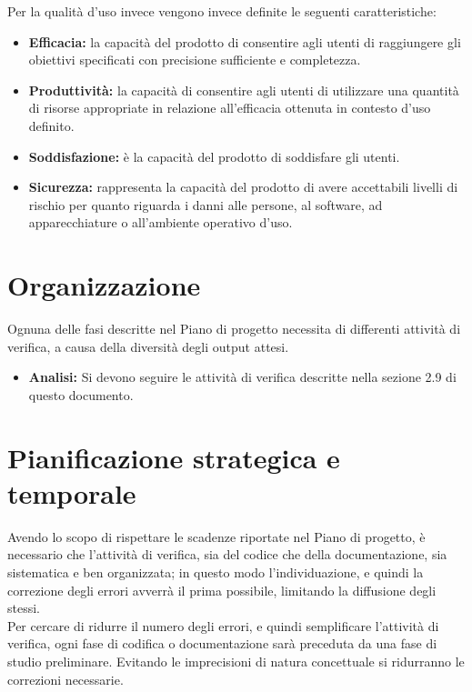 \documentclass[a4paper]{report}
\begin{document}
				Per la qualità d'uso invece vengono invece definite le seguenti caratteristiche:
				\begin{itemize}
					\item \textbf{Efficacia:} la capacità del prodotto di consentire agli utenti di raggiungere gli obiettivi
					specificati con precisione sufficiente e completezza. 
					\item \textbf{Produttività:} la capacità di consentire agli utenti di utilizzare una quantità di risorse
					appropriate in relazione all'efficacia ottenuta in contesto d'uso definito. 
					\item \textbf{Soddisfazione:} è la capacità del prodotto di soddisfare gli utenti. 
					\item \textbf{Sicurezza:} rappresenta la capacità del prodotto di avere accettabili livelli di rischio per
					quanto riguarda i danni alle persone, al software, ad apparecchiature o all'ambiente operativo d'uso. 
				\end{itemize}
			
			
		\section{Organizzazione}
			Ognuna delle fasi descritte nel Piano di progetto necessita di differenti attività di verifica, a causa della
			diversità degli output attesi.
			\begin{itemize}
				\item \textbf{Analisi:} Si devono seguire le attività di verifica descritte nella sezione 2.9 di questo documento.
			\end{itemize}
		
		
		\section{Pianificazione strategica e temporale}
			Avendo lo scopo di rispettare le scadenze riportate nel Piano di progetto, è necessario che l'attività 
			di verifica, sia del codice che della documentazione, sia sistematica e ben organizzata; in questo modo 
			l'individuazione, e quindi la correzione degli errori avverrà il prima possibile, limitando la diffusione 
			degli stessi.\\
			Per cercare di ridurre il numero degli errori, e quindi semplificare l'attività di verifica, ogni fase 
			di codifica o documentazione sarà preceduta da una fase di studio preliminare. Evitando le imprecisioni 
			di natura concettuale si ridurranno le correzioni necessarie.
			
\end{document}
